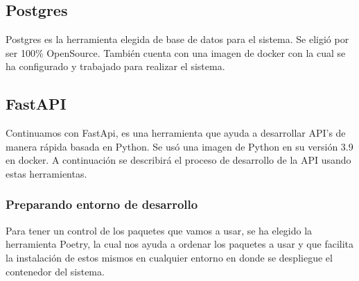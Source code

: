 \subsection{Postgres}
Postgres es la herramienta elegida de base de datos para el sistema. Se eligió por ser 100\% OpenSource. También cuenta con una imagen de docker con la cual se ha configurado y trabajado para realizar el sistema.

\subsection{FastAPI}
Continuamos con FastApi, es una herramienta que ayuda a desarrollar API's de manera rápida basada en Python. Se usó una imagen de Python en su versión 3.9 en docker. A continuación se describirá el proceso de desarrollo de la API usando estas herramientas.

\subsubsection{Preparando entorno de desarrollo}
Para tener un control de los paquetes que vamos a usar, se ha elegido la herramienta Poetry, la cual nos ayuda a ordenar los paquetes a usar y que facilita la instalación de estos mismos en cualquier entorno en donde se despliegue el contenedor del sistema.

